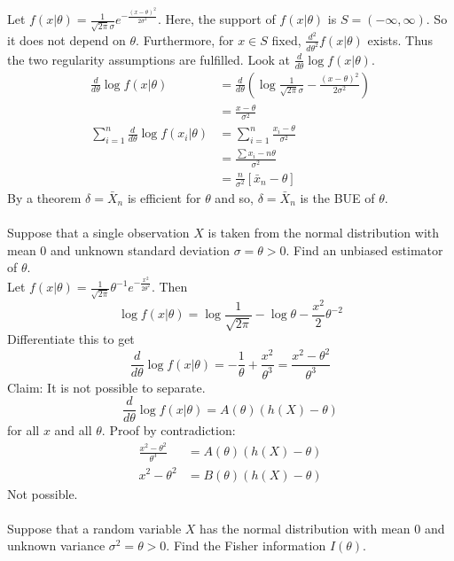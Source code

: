 \documentclass[12pt]{article}
\begin{document}
Let $f(x | \theta) = \frac{1}{\sqrt{2\pi} \sigma} e^{-\frac{(x-\theta)^2}{2\sigma^2}}$. Here, the support of $f(x|\theta)$ is $S = (-\infty,\infty)$. So it does not depend on $\theta$. Furthermore, for $x \in S$ fixed, $\frac{d^2}{d\theta^2} f(x|\theta)$ exists. Thus the two regularity assumptions are fulfilled. Look at $\frac{d}{d\theta} \log f(x|\theta)$. $$ \begin{aligned} \frac{d}{d\theta} \log f(x | \theta) &= \frac{d}{d\theta} (\log \frac{1}{\sqrt{2\pi} \sigma} - \frac{(x-\theta)^2}{2\sigma^2}) \\ &= \frac{x-\theta}{\sigma^2} \\ \sum_{i=1}^n \frac{d}{d\theta} \log f(x_i | \theta) &= \sum_{i=1}^n \frac{x_i - \theta}{\sigma^2} \\ &= \frac{\sum x_i - n\theta}{\sigma^2} \\ &= \frac{n}{\sigma^2}[\bar{x}_n - \theta] \end{aligned} $$ By a theorem $\delta = \bar{X}_n$ is efficient for $\theta$ and so, $\delta = \bar{X}_n$ is the BUE of $\theta$. \\~\\
Suppose that a single observation $X$ is taken from the normal distribution with mean $0$ and unknown standard deviation $\sigma = \theta > 0$. Find an unbiased estimator of $\theta$. \\
Let $f(x|\theta) = \frac{1}{\sqrt{2\pi}}\theta^{-1}e^{-\frac{x^2}{2\theta^2}}$. Then $$ \log f(x|\theta) = \log \frac{1}{\sqrt{2\pi}} - \log \theta - \frac{x^2}{2}\theta^{-2} $$ Differentiate this to get $$ \frac{d}{d\theta} \log f(x|\theta) = -\frac{1}{\theta} + \frac{x^2}{\theta^3} = \frac{x^2 - \theta^2}{\theta^3} $$ Claim: It is not possible to separate. $$ \frac{d}{d\theta} \log f(x | \theta) = A(\theta)(h(X)-\theta)$$ for all $x$ and all $\theta$. Proof by contradiction: $$ \begin{aligned} \frac{x^2 - \theta^2}{\theta^3} &= A(\theta)(h(X) - \theta) \\ x^2 - \theta^2 &= B(\theta)(h(X) - \theta) \end{aligned} $$ Not possible. \\~\\
Suppose that a random variable $X$ has the normal distribution with mean $0$ and unknown variance $\sigma^2 = \theta > 0$. Find the Fisher information $I(\theta)$. \\
\end{document}
